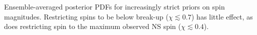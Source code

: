 \label{fig:restricted_priors} Ensemble-averaged posterior PDFs for increasingly strict priors on spin magnitudes.  Restricting spins to be below break-up ($\chi\lesssim0.7$) has little effect, as does restricting spin to the maximum observed NS spin ($\chi\lesssim0.4$).